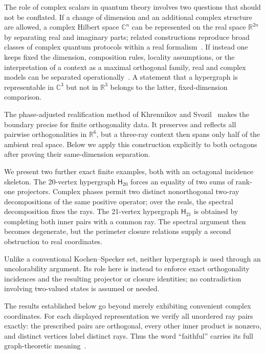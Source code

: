 \documentclass[twocolumn,aps,pra,floatfix,amsmath,amssymb,longbibliography]{revtex4-2}
\theoremstyle{definition}
\theoremstyle{remark}
\newcommand{\C}{\mathbb C}
\newcommand{\R}{\mathbb R}
\newcommand{\Htwenty}{\mathsf H_{20}}
\newcommand{\Htwentyone}{\mathsf H_{21}}
\begin{document}
The role of complex scalars in quantum theory involves two questions that
should not be conflated.  If a change of dimension and an additional complex
structure are allowed, a complex Hilbert space $\C^n$ can be represented on
the real space $\R^{2n}$ by separating real and imaginary parts; related
constructions reproduce broad classes of complex quantum protocols within a
real formalism~\cite{Hardy2012LimitedHolism,Aleksandrova2013UniversalQubit,
McKague2009SimulatingRealHilbert}.  If instead one keeps fixed the dimension,
composition rules, locality assumptions, or the interpretation of a context
as a maximal orthogonal family, real and complex models can be separated
operationally~\cite{renou-2021,Weilenmann2025PartialIndependencePRL,
Bednorz2022OptimalDiscrimination}.  A statement that a hypergraph is
representable in $\C^3$ but not in $\R^3$ belongs to the latter,
fixed-dimension comparison.

The phase-adjusted realification method of Khrennikov and
Svozil~\cite{svozil-2025-rvc} makes the boundary precise for finite
orthogonality data.  It preserves and reflects all pairwise orthogonalities in
$\R^6$, but a three-ray context then spans only half of the ambient real
space.  Below we apply this construction explicitly to both octagons after
proving their same-dimension separation.

We present two further exact finite examples, both with an octagonal incidence
skeleton.  The 20-vertex hypergraph $\Htwenty$ forces an equality of
two sums of rank-one projectors.  Complex phases permit two distinct
nonorthogonal two-ray decompositions of the same positive operator; over the
reals, the spectral decomposition fixes the rays.  The 21-vertex hypergraph
$\Htwentyone$ is obtained by completing both inner pairs with a common ray.
The spectral argument then becomes degenerate, but the perimeter closure
relations supply a second obstruction to real coordinates.

Unlike a conventional Kochen--Specker set, neither hypergraph is used through
an uncolorability argument.  Its role here is instead to enforce exact
orthogonality incidences and the resulting projector or closure identities;
no contradiction involving two-valued states is assumed or needed.

The results established below go beyond merely exhibiting convenient complex
coordinates.  For each displayed representation we verify all unordered ray
pairs exactly: the prescribed pairs are orthogonal, every other inner product
is nonzero, and distinct vertices label distinct rays.  Thus the word
``faithful'' carries its full graph-theoretic meaning~\cite{lovasz-79,Portillo-2015}.
\end{document}
